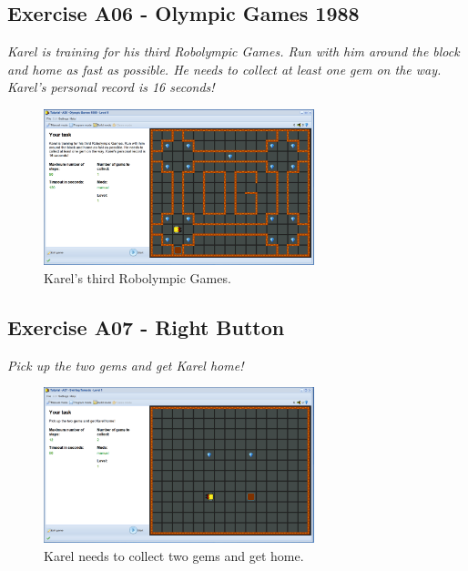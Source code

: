 \documentclass[article,A4,12pt]{llncs}
\begin{document}
\newpage

\subsection{Exercise A06 - Olympic Games 1988 }

{\em Karel is training for his third Robolympic Games. Run with him around the block and home as fast as possible. He needs to collect at least one gem on the way. Karel's personal record is 16 seconds!}

\begin{figure}[!ht]
\begin{center}
\includegraphics[width=0.7\textwidth]{img/a06.png}
\end{center}
\vspace{-4mm}
\caption{Karel's third Robolympic Games.}
\label{fig:a06}
\vspace{-1cm}
\end{figure}
\noindent


\subsection{Exercise A07 - Right Button}

{\em Pick up the two gems and get Karel home!}

\begin{figure}[!ht]
\begin{center}
\includegraphics[width=0.7\textwidth]{img/a07.png}
\end{center}
\vspace{-4mm}
\caption{Karel needs to collect two gems and get home.}
\label{fig:a07}
\vspace{-1cm}
\end{figure}
\noindent
\newpage
\end{document}

